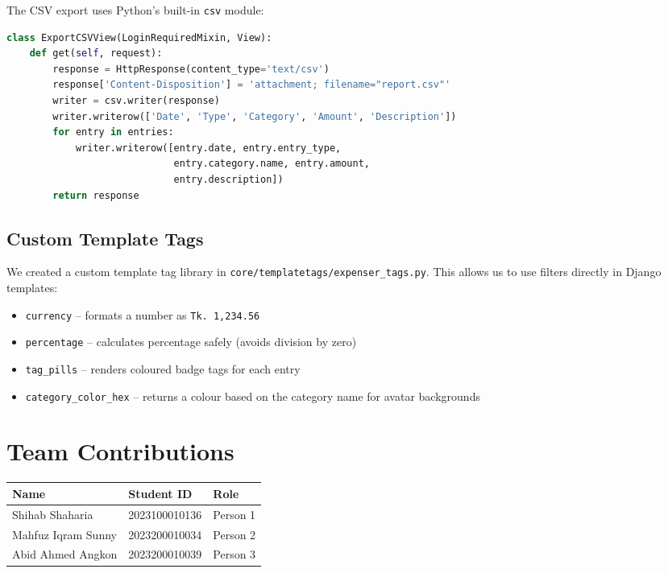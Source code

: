 \documentclass[12pt,a4paper]{report}
\begin{document}
The CSV export uses Python's built-in \texttt{csv} module:

\begin{lstlisting}[language=Python]
class ExportCSVView(LoginRequiredMixin, View):
    def get(self, request):
        response = HttpResponse(content_type='text/csv')
        response['Content-Disposition'] = 'attachment; filename="report.csv"'
        writer = csv.writer(response)
        writer.writerow(['Date', 'Type', 'Category', 'Amount', 'Description'])
        for entry in entries:
            writer.writerow([entry.date, entry.entry_type,
                             entry.category.name, entry.amount,
                             entry.description])
        return response
\end{lstlisting}

\section{Custom Template Tags}

We created a custom template tag library in \texttt{core/templatetags/expenser\_tags.py}. This allows us to use filters directly in Django templates:

\begin{itemize}
  \item \texttt{currency} -- formats a number as \texttt{Tk. 1,234.56}
  \item \texttt{percentage} -- calculates percentage safely (avoids division by zero)
  \item \texttt{tag\_pills} -- renders coloured badge tags for each entry
  \item \texttt{category\_color\_hex} -- returns a colour based on the category name for avatar backgrounds
\end{itemize}

\chapter{Team Contributions}

\begin{table}[htbp]
\centering
\begin{tabular}{|l|l|l|}
\hline
\textbf{Name} & \textbf{Student ID} & \textbf{Role} \\
\hline
Shihab Shaharia    & 2023100010136 & Person 1 \\
Mahfuz Iqram Sunny & 2023200010034 & Person 2 \\
Abid Ahmed Angkon  & 2023200010039 & Person 3 \\
\hline
\end{tabular}
\end{table}
\end{document}
